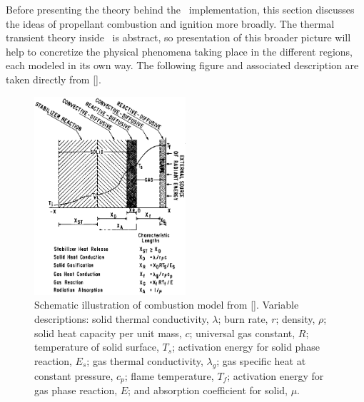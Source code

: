 \setcounter{figure}{0}
\setcounter{table}{0}
\setcounter{equation}{0}


Before presenting the theory behind the \Rocburn\ implementation, this section discusses the ideas of propellant combustion and ignition more broadly. The thermal transient theory inside \Rocburn\ is abstract, so presentation of this broader picture will help to concretize the physical phenomena taking place in the different regions, each modeled in its own way. The following figure and associated description are taken directly from [\cite{Ibiricu:1975}].

\begin{figure}[ht]
\centering
\includegraphics[width=0.5\textwidth]{../Figures/IbiricuCombustionModel.png}
\caption{Schematic illustration of combustion model from [\cite{Ibiricu:1975}]. Variable descriptions: solid thermal conductivity, $\lambda$; burn rate, $r$; density, $\rho$; solid heat capacity per unit mass, $c$; universal gas constant, $R$; temperature of solid surface, $T_s$; activation energy for solid phase reaction, $E_s$; gas thermal conductivity, $\lambda_g$; gas specific heat at constant pressure, $c_p$; flame temperature, $T_f$; activation energy for gas phase reaction, $E$; and absorption coefficient for solid, $\mu$.}
\label{fig:ibiricu}
\end{figure}

